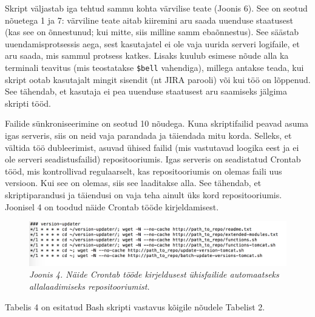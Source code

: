 \documentclass[12pt]{article}
\newcommand{\code}[1]{\texttt{#1}}
\begin{document}
   Skript väljastab iga tehtud sammu kohta värvilise teate (Joonis 6). See on seotud nõuetega 1 ja 7: värviline teate aitab kiiremini aru saada uuenduse staatusest (kas see on õnnestunud; kui mitte, siis milline samm ebaõnnestus). See säästab uuendamisprotsessis aega, sest kasutajatel ei ole vaja uurida serveri logifaile, et aru saada, mis sammul protsess katkes. Lisaks kuulub esimese nõude alla ka terminali teavitus (mis teostatakse \code{\$bell} vahendiga), millega antakse teada, kui skript ootab kasutajalt mingit sisendit (nt JIRA parooli) või kui töö on lõppenud. See tähendab, et kasutaja ei pea uuenduse staatusest aru saamiseks jälgima skripti tööd.
   
   Failide sünkroniseerimine on seotud 10 nõudega. Kuna skriptifailid peavad asuma igas serveris, siis on neid vaja parandada ja täiendada mitu korda. Selleks, et vältida töö dubleerimist, asuvad ühised failid (mis vastutavad loogika eest ja ei ole serveri seadistusfailid) repositooriumis. Igas serveris on seadistatud Crontab \cite{cron} tööd, mis kontrollivad regulaarselt, kas repositooriumis on olemas faili uus versioon. Kui see on olemas, siis see laaditakse alla. See tähendab, et skriptiparandusi ja täiendusi on vaja teha ainult üks kord repositooriumis. Joonisel 4 on toodud näide Crontab tööde kirjeldamisest.
   \begin{figure}[H]
     \begin{center} 
       \includegraphics[width=\textwidth]{screenshots/crontab.png}
       \caption*{\textit{Joonis 4. Näide Crontab tööde kirjeldusest ühisfailide automaatseks allalaadimiseks repositooriumist.}}
     \end{center}
   \end{figure}
   
   \newpage
   
    Tabelis 4 on esitatud Bash skripti vastavus kõigile nõudele Tabelist 2.
   
\end{document}
